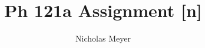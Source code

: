 \documentclass[12pt]{article}
\begin{document}
\title{Ph 121a Assignment [n]}
\author{Nicholas Meyer}

\maketitle

\section{}
\end{document}

